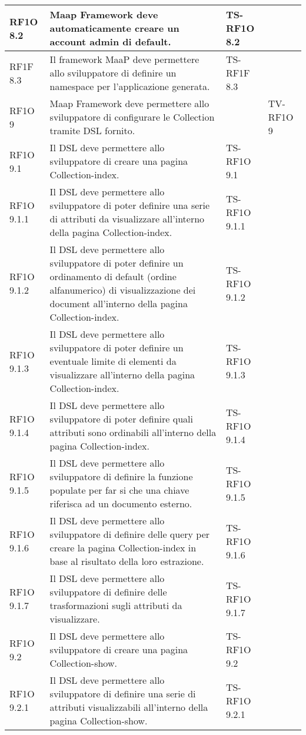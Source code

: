 \begin{center}
\begin{longtable}{| p{2cm} | p{6cm} | p{2.5cm} | p{2.5cm} | }
				RF1O 8.2 & 
				Maap Framework deve automaticamente creare un account admin di default. & TS-RF1O 8.2 & \\ \hline 
				RF1F 8.3 & 
				Il framework MaaP deve permettere allo sviluppatore di definire un namespace per l’applicazione generata. & TS-RF1F 8.3 & \\ \hline 
				RF1O 9 & 
				Maap Framework deve permettere allo sviluppatore di configurare le Collection tramite DSL fornito. &  & TV-RF1O 9 \\ \hline 
				RF1O 9.1 & 
				Il DSL deve permettere allo sviluppatore di creare una pagina Collection-index. & TS-RF1O 9.1 & \\ \hline 
				RF1O 9.1.1 & 
				Il DSL deve permettere allo sviluppatore di poter definire una serie di attributi da visualizzare all’interno della pagina Collection-index. & TS-RF1O 9.1.1 & \\ \hline 
				RF1O 9.1.2 & 
				Il DSL deve permettere allo sviluppatore di poter definire un ordinamento di default (ordine alfanumerico) di visualizzazione dei document all'interno della pagina Collection-index. & TS-RF1O 9.1.2 & \\ \hline 
				RF1O 9.1.3 & 
				Il DSL deve permettere allo sviluppatore di poter definire un eventuale limite di elementi da visualizzare all’interno della pagina Collection-index. & TS-RF1O 9.1.3 & \\ \hline 
				RF1O 9.1.4 & 
				Il DSL deve permettere allo sviluppatore di poter definire quali attributi sono ordinabili all’interno della pagina Collection-index. & TS-RF1O 9.1.4 & \\ \hline 
				RF1O 9.1.5 & 
				Il DSL deve permettere allo sviluppatore di definire la funzione populate per far si che una chiave riferisca ad un documento esterno. & TS-RF1O 9.1.5 & \\ \hline 
				RF1O 9.1.6 & 
				Il DSL deve permettere allo sviluppatore di definire delle query per creare la pagina Collection-index in base al risultato della loro estrazione. & TS-RF1O 9.1.6 & \\ \hline 
				RF1O 9.1.7 & 
				Il DSL deve permettere allo sviluppatore di definire delle trasformazioni sugli attributi da visualizzare. & TS-RF1O 9.1.7 & \\ \hline 
				RF1O 9.2 & 
				Il DSL deve permettere allo sviluppatore di creare una pagina Collection-show. & TS-RF1O 9.2 & \\ \hline 
				RF1O 9.2.1 & 
				Il DSL deve permettere allo sviluppatore di definire una serie di attributi visualizzabili all’interno della pagina Collection-show. & TS-RF1O 9.2.1 & \\ \hline 

\end{longtable}
\end{center}
